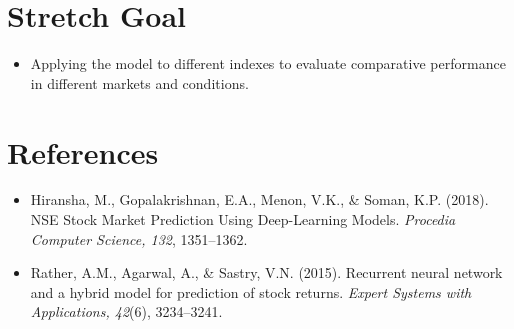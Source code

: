 \documentclass[a4paper,11pt]{article} %
\begin{document}
\section*{Stretch Goal}
\begin{itemize}
    \item Applying the model to different indexes to evaluate comparative performance in different markets and conditions.
\end{itemize}

\section*{References}

\begin{itemize}
  \item Hiransha, M., Gopalakrishnan, E.A., Menon, V.K., \& Soman, K.P. (2018). NSE Stock Market Prediction Using Deep-Learning Models. \textit{Procedia Computer Science, 132}, 1351--1362.

  \item Rather, A.M., Agarwal, A., \& Sastry, V.N. (2015). Recurrent neural network and a hybrid model for prediction of stock returns. \textit{Expert Systems with Applications, 42}(6), 3234--3241.
\end{itemize}

\smaller
\printbibliography
\end{document}
